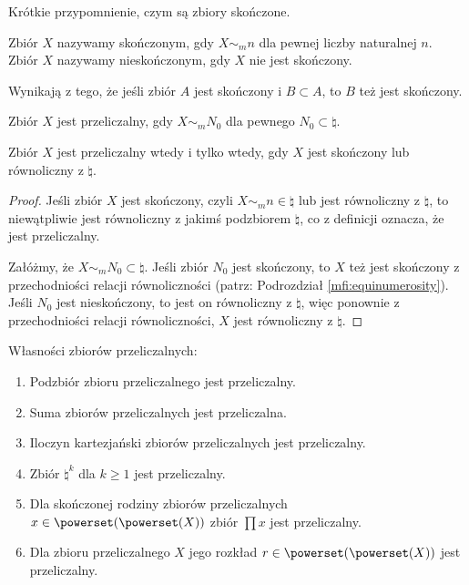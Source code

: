 Krótkie przypomnienie, czym są zbiory skończone.
\begin{definition}
    Zbiór \( X \) nazywamy skończonym, gdy \( X \sim_{m} n \) dla pewnej liczby naturalnej \( n \). \\
    Zbiór \( X \) nazywamy nieskończonym, gdy \( X \) nie jest skończony.
\end{definition}
Wynikają z tego, że jeśli zbiór \( A \) jest skończony i \( B \subset A \), to \( B \) też jest skończony.

\begin{definition}
    Zbiór \( X \) jest przeliczalny, gdy \( X \sim_{m} N_0 \) dla pewnego \( N_0 \subset \natural \).
\end{definition}
\begin{theorem}
    Zbiór \( X \) jest przeliczalny wtedy i tylko wtedy, gdy \( X \) jest skończony lub równoliczny z \( \natural \).
\end{theorem}
\begin{proof}
    Jeśli zbiór \( X \) jest skończony, czyli \( X \sim_{m} n \in \natural \) lub jest równoliczny z \( \natural \), to niewątpliwie jest równoliczny z jakimś podzbiorem \( \natural \), co z definicji oznacza, że jest przeliczalny.
    
    Załóżmy, że \( X \sim_{m} N_0 \subset \natural \). Jeśli zbiór \( N_0 \) jest skończony, to \( X \) też jest skończony z przechodniości relacji równoliczności (patrz: Podrozdział \ref{mfi:equinumerosity}).
    Jeśli \( N_0 \) jest nieskończony, to jest on równoliczny z \( \natural \), więc ponownie z przechodniości relacji równoliczności, \( X \) jest równoliczny z \( \natural \).
\end{proof}

\begin{lemma}
    \label{lemma:countable-properties}
    Własności zbiorów przeliczalnych:
    \begin{enumerate}
        \item Podzbiór zbioru przeliczalnego jest przeliczalny.
        \item Suma zbiorów przeliczalnych jest przeliczalna.
        \item Iloczyn kartezjański zbiorów przeliczalnych jest przeliczalny.
        \item Zbiór \( \natural^k \) dla \( k \geq 1 \) jest przeliczalny.
        \item Dla skończonej rodziny zbiorów przeliczalnych \( x \in \powerset(\powerset(X)) \) zbiór \( \prod x \) jest przeliczalny.
        \item Dla zbioru przeliczalnego \( X \) jego rozkład \( r \in \powerset(\powerset(X)) \) jest przeliczalny.
    \end{enumerate}
\end{lemma}